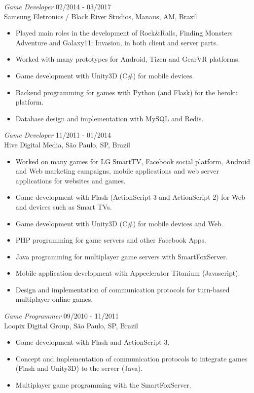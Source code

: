 \documentclass[line,margin]{res}
\begin{document}
\begin{resume}
                {\sl Game Developer} \hfill 02/2014 - 03/2017 \\
                Samsung Eletronics / Black River Studios, Manaus, AM, Brazil
                 \begin{itemize}  \itemsep 1.25pt
                 \item Played main roles in the development of Rock\&Rails, Finding Monsters Adventure and Galaxy11: Invasion, in both client and server parts.
                 \item Worked with many prototypes for Android, Tizen and GearVR platforms.
                 \item Game development with Unity3D (C\#) for mobile devices.
				 \item Backend programming for games with Python (and Flask) for the heroku platform.
                 \item Database design and implementation with MySQL and Redis.
                 \end{itemize}
                 
				{\sl Game Developer} \hfill 11/2011 - 01/2014 \\
                Hive Digital Media, São Paulo, SP, Brazil
                 \begin{itemize}  \itemsep 1.25pt
                 \item Worked on many games for LG SmartTV, Facebook social platform, Android and Web marketing campaigns, mobile applications and web server applications for websites and games.
                 \item Game development with Flash (ActionScript 3 and ActionScript 2) for Web and devices such as Smart TVs.
		 		 \item Game development with Unity3D (C\#) for mobile devices and Web.
                 \item PHP programming for game servers and other Facebook Apps.
                 \item Java programming for multiplayer game servers with SmartFoxServer.
		 		 \item Mobile application development with Appcelerator Titanium (Javascript).
                 \item Design and implementation of communication protocols for turn-based multiplayer online games.
                 \end{itemize}
                 
                {\sl Game Programmer} \hfill 09/2010 - 11/2011 \\
                Loopix Digital Group, São Paulo, SP, Brazil
                 \begin{itemize}  \itemsep 1.25pt
                 \item Game development with Flash and ActionScript 3.
                 \item Concept and implementation of communication protocols to integrate games (Flash and Unity3D) to the server (Java).
                 \item Multiplayer game programming with the SmartFoxServer.
                 \end{itemize}
 

\end{resume}
\end{document}
